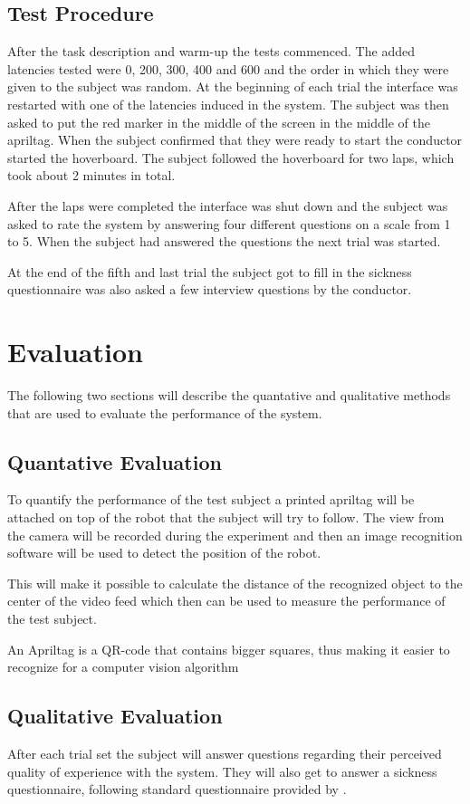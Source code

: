 \documentclass[nofilelist]{cslthse-msc}
\begin{document}
\subsection{Test Procedure}
After the task description and warm-up the tests commenced. The added latencies tested were 0, 200, 300, 400 and 600 and the order in which they were given to the subject was random. 
At the beginning of each trial the interface was restarted with one of the latencies induced in the system. The subject was then asked to put the red marker in the middle of the screen in the middle of the apriltag. When the subject confirmed that they were ready to start the conductor started the hoverboard. The subject followed the hoverboard for two laps, which took about 2 minutes in total.

After the laps were completed the interface was shut down and the subject was asked to rate the system by answering four different questions on a scale from 1 to 5. When the subject had answered the questions the next trial was started.

At the end of the fifth and last trial the subject got to fill in the sickness questionnaire was also asked a few interview questions by the conductor.

\section{Evaluation}
The following two sections will describe the quantative and qualitative methods that are used to evaluate the performance of the system.

\subsection{Quantative Evaluation}
To quantify the performance of the test subject a printed apriltag will be attached on top of the robot that the subject will try to follow. The view from the camera will be recorded during the experiment and then an image recognition software will be used to detect the position of the robot. 

This will make it possible to calculate the distance of the recognized object to the center of the video feed which then can be used to measure the performance of the test subject.

An Apriltag is a QR-code that contains bigger squares, thus making it easier to recognize for a computer vision algorithm

\subsection{Qualitative Evaluation}
After each trial set the subject will answer questions regarding their perceived quality of experience with the system. They will also get to answer a sickness questionnaire, following standard questionnaire provided by \cite{SICKNESSQ}.
\end{document}
